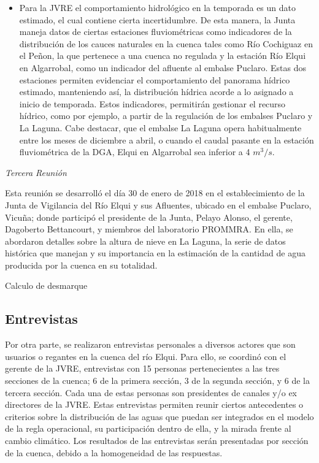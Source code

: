 \documentclass[11pt,]{article}
\begin{document}
\begin{itemize}
		\item Para la JVRE el comportamiento hidrológico en la temporada es un dato estimado, el cual contiene cierta incertidumbre. De esta manera, la Junta maneja datos de ciertas estaciones fluviométricas como indicadores de la distribución de los cauces naturales en la cuenca tales como Río Cochiguaz en el Peñon, la que pertenece a una cuenca no regulada y la estación Río Elqui en Algarrobal, como un indicador del afluente al embalse Puclaro. Estas dos estaciones permiten evidenciar el comportamiento del panorama hídrico estimado, manteniendo así, la distribución hídrica acorde a lo asignado a inicio de temporada. Estos indicadores, permitirán gestionar el recurso hídrico, como por ejemplo, a partir de la regulación de los embalses Puclaro y La Laguna. Cabe destacar, que el embalse La Laguna opera habitualmente entre los meses de diciembre a abril, o cuando el caudal pasante en la estación fluviométrica de la DGA, Elqui en Algarrobal sea inferior a 4 $ m^3/s$.\bigskip
		
		\end{itemize}		\bigskip
		
		\textit {Tercera Reunión}\bigskip
		
	Esta reunión se desarrolló el día 30 de enero de 2018 en el establecimiento de la Junta de Vigilancia del Río Elqui y sus Afluentes, ubicado en el embalse Puclaro, Vicuña; donde participó el presidente de la Junta, Pelayo Alonso, el gerente, Dagoberto Bettancourt, y miembros del laboratorio PROMMRA. En ella, se abordaron detalles sobre la altura de nieve en La Laguna, la serie de datos histórica que manejan y su importancia en la estimación de la cantidad de agua producida por la cuenca en su totalidad.
	
	Calculo de desmarque
	
		
		\subsection{Entrevistas}\bigskip
		
Por otra parte, se realizaron entrevistas personales a diversos actores que son usuarios o regantes en la cuenca del río Elqui. Para ello, se coordinó con el gerente de la JVRE, entrevistas con 15 personas pertenecientes a las tres secciones de la cuenca; 6 de la primera sección, 3 de la segunda sección, y 6 de la tercera sección. Cada una de estas personas son presidentes de canales y/o ex directores de la JVRE. Estas entrevistas permiten reunir ciertos antecedentes o criterios sobre la distribución de las aguas que puedan ser integrados en el modelo de la regla operacional, su participación dentro de ella, y la mirada frente al cambio climático. Los resultados de las entrevistas serán presentadas por sección de la cuenca, debido a la homogeneidad de las respuestas.\bigskip
\end{document}
